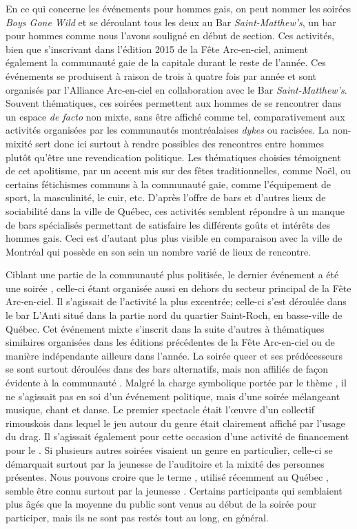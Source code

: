 En ce qui concerne les événements pour hommes gais, on peut nommer les soirées \emph{Boys Gone Wild} et  se déroulant tous les deux au Bar \emph{Saint-Matthew's}, un bar pour hommes comme nous l'avons souligné en début de section.
Ces activités, bien que s'inscrivant dans l'édition 2015 de la Fête Arc-en-ciel, animent également la communauté gaie de la capitale durant le reste de l'année.
Ces événements se produisent à raison de trois à quatre fois par année et sont organisés par l'Alliance Arc-en-ciel en collaboration avec le Bar \emph{Saint-Matthew's}.
Souvent thématiques, ces soirées permettent aux hommes de se rencontrer dans un espace \emph{de facto} non mixte, sans être affiché comme tel, comparativement aux activités organisées par les communautés montréalaises \emph{dykes} ou racisées.
La non-mixité sert donc ici surtout à rendre possibles des rencontres entre hommes plutôt qu'être une revendication politique.
Les thématiques choisies témoignent de cet apolitisme, par un accent mis sur des fêtes traditionnelles, comme Noël, ou certains fétichismes communs à la communauté gaie, comme l'équipement de sport, la masculinité, le cuir, etc.
D'après l'offre de bars et d'autres lieux de sociabilité dans la ville de Québec, ces activités semblent répondre à un manque de bars spécialisés permettant de satisfaire les différents goûts et intérêts des hommes gais.
Ceci est d'autant plus plus visible en comparaison avec la ville de Montréal qui possède en son sein un nombre varié de lieux de rencontre.

Ciblant une partie de la communauté plus politisée, le dernier événement a été une soirée \qu{}, celle-ci étant organisée aussi en dehors du secteur principal de la Fête Arc-en-ciel.
Il s'agissait de l'activité la plus excentrée; celle-ci s'est déroulée dans le bar L'Anti situé dans la partie nord du quartier Saint-Roch, en basse-ville de Québec.
Cet événement mixte s'inscrit dans la suite d'autres à thématiques similaires organisées dans les éditions précédentes de la Fête Arc-en-ciel ou de manière indépendante ailleurs dans l'année.
La soirée queer et ses prédécesseurs se sont surtout déroulées dans des bars alternatifs, mais non affiliés de façon évidente à la communauté \lgbt.
Malgré la charge symbolique portée par le thème \qu, il ne s'agissait pas en soi d'un événement politique, mais d'une soirée mélangeant musique, chant et danse.
Le premier spectacle était l'œuvre d'un collectif \qu rimouskois dans lequel le jeu autour du genre était clairement affiché par l'usage du drag.
Il s'agissait également pour cette occasion d'une activité de financement pour le \ggul.
Si plusieurs autres soirées visaient un genre en particulier, celle-ci se démarquait surtout par la jeunesse de l'auditoire et la mixité des personnes présentes.
Nous pouvons croire que le terme \qu, utilisé récemment au Québec , semble être connu surtout par la jeunesse \lgbt.
Certains participants qui semblaient plus âgés que la moyenne du public sont venus au début de la soirée pour participer, mais ils ne sont pas restés tout au long, en général.

